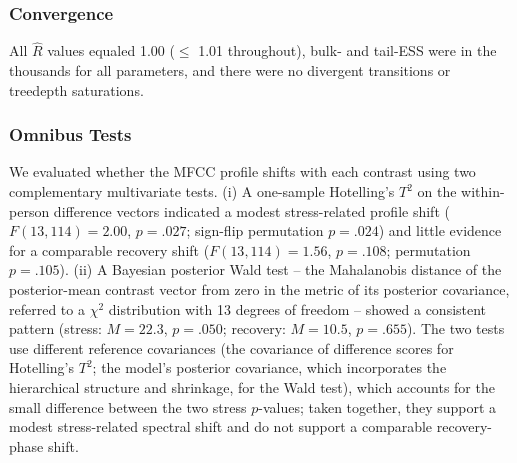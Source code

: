 \documentclass[
  english,
  man,floatsintext]{apa6}
\begin{document}
\subsubsection{Convergence}\label{convergence}

All \(\hat{R}\) values equaled 1.00 (\(\leq\) 1.01 throughout), bulk- and tail-ESS were in the thousands for all parameters, and there were no divergent transitions or treedepth saturations.

\subsubsection{Omnibus Tests}\label{omnibus-tests}

We evaluated whether the MFCC profile shifts with each contrast using two complementary multivariate tests. (i) A one-sample Hotelling's \(T^2\) on the within-person difference vectors indicated a modest stress-related profile shift (\(F(13, 114) = 2.00\), \(p = .027\); sign-flip permutation \(p = .024\)) and little evidence for a comparable recovery shift (\(F(13, 114) = 1.56\), \(p = .108\); permutation \(p = .105\)). (ii) A Bayesian posterior Wald test -- the Mahalanobis distance of the posterior-mean contrast vector from zero in the metric of its posterior covariance, referred to a \(\chi^2\) distribution with 13 degrees of freedom -- showed a consistent pattern (stress: \(M = 22.3\), \(p = .050\); recovery: \(M = 10.5\), \(p = .655\)). The two tests use different reference covariances (the covariance of difference scores for Hotelling's \(T^2\); the model's posterior covariance, which incorporates the hierarchical structure and shrinkage, for the Wald test), which accounts for the small difference between the two stress \(p\)-values; taken together, they support a modest stress-related spectral shift and do not support a comparable recovery-phase shift.
\end{document}
